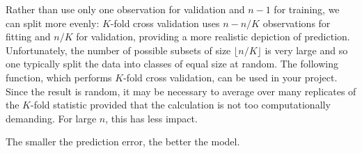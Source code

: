\documentclass[]{book}
\theoremstyle{definition}
\theoremstyle{definition}
\theoremstyle{definition}
\theoremstyle{remark}
\begin{document}
Rather than use only one observation for validation and \(n-1\) for training, we can split more evenly: \(K\)-fold cross validation uses \(n-n/K\) observations for fitting and \(n/K\) for validation, providing a more realistic depiction of prediction. Unfortunately, the number of possible subsets of size \(\lfloor n/K\rfloor\) is very large and so one typically split the data into classes of equal size at random. The following function, which performs \(K\)-fold cross validation, can be used in your project. Since the result is random, it may be necessary to average over many replicates of the \(K\)-fold statistic provided that the calculation is not too computationally demanding. For large \(n\), this has less impact.

The smaller the prediction error, the better the model.
\end{document}
